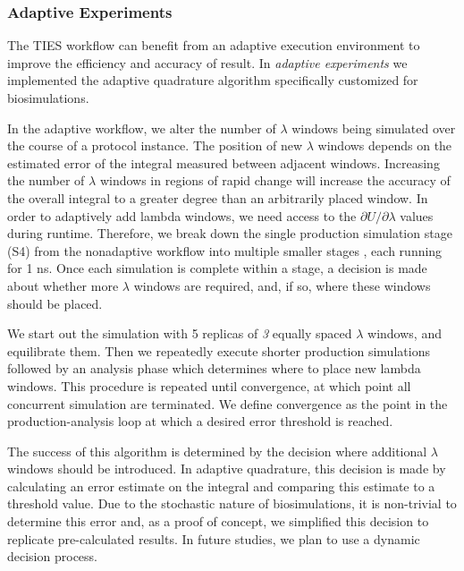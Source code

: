 \subsubsection{Adaptive Experiments}

The TIES workflow can benefit from an adaptive execution environment to
improve the efficiency and accuracy of result. In \emph{adaptive experiments}
we implemented the adaptive quadrature algorithm specifically customized for
biosimulations.

In the adaptive workflow, we alter the number of $\lambda$ windows being
simulated over the course of a protocol instance. The position of new
$\lambda$ windows depends on the estimated error of the integral measured
between adjacent windows. Increasing the number of $\lambda$ windows in
regions of rapid change will increase the accuracy of the overall integral to
a greater degree than an arbitrarily placed window. In order to adaptively
add lambda windows, we need access to the $\partial U/\partial\lambda$ values
during runtime. Therefore, we break down the single production simulation
stage (S4)  from the nonadaptive workflow into multiple smaller stages , each running for 1 ns. Once each simulation is complete within a
stage, a decision is made about whether more $\lambda$ windows are required,
and, if so, where these windows should be placed.

We start out the simulation with 5 replicas of \emph{3}  equally spaced $\lambda$ windows, and equilibrate them. Then we
repeatedly execute shorter production simulations followed by an analysis
phase which determines where to place new lambda windows. This procedure is
repeated until convergence, at which point all concurrent simulation are
terminated. We define convergence as the point in the production-analysis
loop at which a desired error threshold is reached.

The success of this algorithm is determined by the decision where additional
$\lambda$ windows should be introduced. In adaptive quadrature, this decision
is made by calculating an error estimate on the integral and comparing this
estimate to a threshold value. Due to the stochastic nature of
biosimulations, it is non-trivial to determine this error and, as a proof of
concept, we simplified this decision to replicate pre-calculated results. In
future studies, we plan to use a dynamic decision process.

